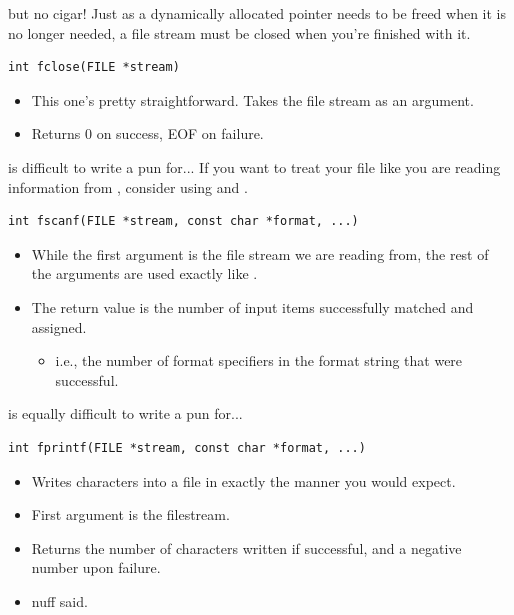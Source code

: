 \documentclass[11pt]{beamer}
\let\OldTexttt\texttt
\renewcommand{\texttt}[1]{\OldTexttt{\color{teal}{#1}}}
\begin{document}
\begin{frame}[fragile=singleslide]{\texttt{fclose()} but no cigar!}
Just as a dynamically allocated pointer needs to be freed when it is no longer needed, a file stream must be closed when you're finished with it. 
\begin{lstlisting}[style=C]
int fclose(FILE *stream)
\end{lstlisting}
\begin{itemize}
\item This one's pretty straightforward.  Takes the file stream as an argument.
\item Returns 0 on success, EOF on failure.  
\end{itemize}
\end{frame}

\begin{frame}[fragile=singleslide]{\texttt{fscanf()} is difficult to write a pun for...}
If you want to treat your file like you are reading information from \texttt{stdin}, consider using \texttt{fscanf()} and \texttt{fprintf()}.
\begin{lstlisting}[style=C]
int fscanf(FILE *stream, const char *format, ...)
\end{lstlisting}
\begin{itemize}
\item While the first argument is the file stream we are reading from, the rest of the arguments are used exactly like \texttt{scanf()}.
\item The return value is the number of input items successfully matched and assigned. 
\begin{itemize}
\item i.e., the number of format specifiers in the format string that were successful.  
\end{itemize}
\end{itemize}
\end{frame}

\begin{frame}[fragile=singleslide]{\texttt{fprintf()} is equally difficult to write a pun for...}
\begin{lstlisting}[style=C]
int fprintf(FILE *stream, const char *format, ...)
\end{lstlisting}
\begin{itemize}
\item Writes characters into a file in exactly the manner you would expect.
\item First argument is the filestream.
\item Returns the number of characters written if successful, and a negative number upon failure.
\item nuff said.
\end{itemize}
\end{frame}
\end{document}

